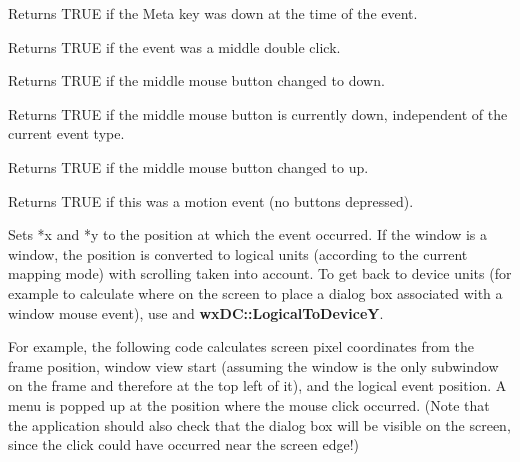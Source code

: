 
Returns TRUE if the Meta key was down at the time of the event.



Returns TRUE if the event was a middle double click.



Returns TRUE if the middle mouse button changed to down.



Returns TRUE if the middle mouse button is currently down, independent
of the current event type.



Returns TRUE if the middle mouse button changed to up.



Returns TRUE if this was a motion event (no buttons depressed).



Sets *x and *y to the position at which the event occurred. If the
window is a window, the position is converted to logical units
(according to the current mapping mode) with scrolling taken into
account. To get back to device units (for example to calculate where on the
screen to place a dialog box associated with a window mouse event), use
 and {\bf wxDC::LogicalToDeviceY}.

For example, the following code calculates screen pixel coordinates
from the frame position, window view start (assuming the window is the only
subwindow on the frame and therefore at the top left of it), and the
logical event position. A menu is popped up at the position where the
mouse click occurred. (Note that the application should also check that
the dialog box will be visible on the screen, since the click could have
occurred near the screen edge!)

